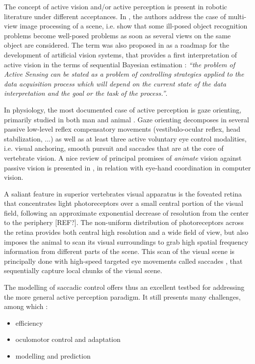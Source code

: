 \documentclass[12pt,twoside,openright]{article}
\begin{document}
	The concept of active vision and/or active perception is present in robotic literature under different acceptances. In \cite{aloimonos1988active}, the authors address the case of multi-view image processing of a scene, i.e. show that some ill-posed object recognition problems become well-posed problems as soon as several views on the  same object are considered. The term was also proposed in \cite{bajcsy1988active} as a roadmap for the development of artificial vision systems, that provides a first interpretation of active vision in the terms of sequential Bayesian estimation : \emph{{\color{blue} ``the problem  of Active Sensing can be stated as a problem of controlling strategies 
	applied to the data acquisition process which will depend on the current state 
	of the data interpretation and  the  goal  or the  task of  the  process.''}}.

	In physiology, the most documented case of active perception is gaze orienting, primarily studied in both man and animal \cite{yarbus1967eye,robinson1968eye}. Gaze orienting decomposes in several passive low-level reflex compensatory movements (vestibulo-ocular reflex, head stabilization, ...) as well as at least three active voluntary eye control modalities, i.e. visual anchoring, smooth pursuit and saccades that are at the core of vertebrate vision.  A nice review of principal promises of \emph{animate} vision against passive vision  is presented in \cite{ballard1991animate},  in relation with eye-hand coordination in computer vision.
	
	A saliant feature in superior vertebrates visual apparatus is the foveated retina that concentrates light photoreceptors over a small central portion of the visual field, {\color{magenta} following an approximate exponential decrease of resolution from the center to the periphery [REF?]}. The non-uniform distribution of photoreceptors across the retina provides both central high resolution and a wide field of view, but also imposes the animal to scan its visual surroundings to grab high spatial frequency information from different parts of the scene. This scan of the visual scene is principally done with high-speed targeted eye movements called saccades \cite{yarbus1967eye}, that sequentially capture local chunks of the visual scene. 
	
	The modelling of saccadic control offers thus an excellent testbed for addressing the more general active perception paradigm. It still presents many challenges, among which :
	\begin{itemize}
		\item efficiency
		\item oculomotor control and adaptation
		\item modelling and prediction
	\end{itemize}
	
\end{document}
